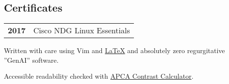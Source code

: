 \documentclass[lighthipster]{simplehipstercv}
\newlength{\rightcolwidth}
\begin{document}
\begin{paracol}{2}
  \section*{Certificates}
  \begin{tabular}{>{\footnotesize\bfseries}r >{\footnotesize}p{}}
    2017 & Cisco NDG Linux Essentials
  \end{tabular}
  \bigskip




  \vfill{} %
  \vspace{4em}
  \setlength{\parindent}{0pt}
  \begin{minipage}[t]{\rightcolwidth}
    \vfill
    \begin{center}\fontfamily{\sfdefault}\selectfont \color{black!90}
      {
        \small
        Written with care using Vim and \href{https://github.com/izcet/latex-resume}{\LaTeX{}} and absolutely zero regurgitative ''GenAI'' software.

        Accessible readability checked with \href{http://www.myndex.com/APCA/}{APCA Contrast Calculator}.
        }
    \end{center}
  \end{minipage}

  \vspace{48em}
\end{paracol}
\end{document}
